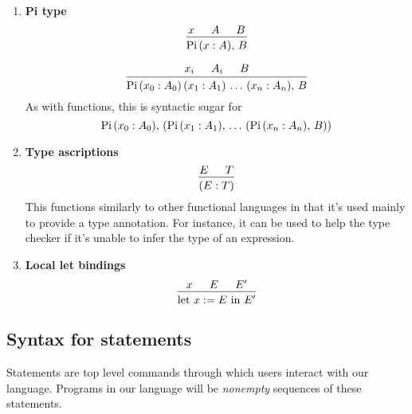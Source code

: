 \documentclass{article}
\begin{document}
\begin{enumerate}
\item \textbf{Pi type} \\
  \[
    \begin{prooftree}
      \hypo{x}
      \hypo{A}
      \hypo{B}
      \infer3{\Pii \, (x : A), \, B}
    \end{prooftree}
  \] 

  \[
    \begin{prooftree}
      \hypo{x_i}
      \hypo{A_i}
      \hypo{B}
      \infer3{\Pii \, (x_0 : A_0) \, (x_1 : A_1) \, \dots \, (x_n : A_n), \, B}
    \end{prooftree}
  \] 
  As with functions, this is syntactic sugar for
  \[ \operatorname{Pi} \, (x_0 : A_0), \, (\operatorname{Pi} \, (x_1 : A_1), \,  \dots \, (\operatorname{Pi} \, (x_n : A_n), \, B)) \]

\item \textbf{Type ascriptions} \\
  \[
    \begin{prooftree}
      \hypo{E}
      \hypo{T}
      \infer2{(E : T)}
    \end{prooftree}
  \]
  This functions similarly to other functional languages in that it's used
  mainly to provide a type annotation. For instance, it can be used to help the
  type checker if it's unable to infer the type of an expression.

\item \textbf{Local let bindings} \\
\[
  \begin{prooftree}
    \hypo{x}
    \hypo{E}
    \hypo{E'}
    \infer3{\text{let } x := E \text{ in } E'}
  \end{prooftree}
\]
\end{enumerate}

\subsection{Syntax for statements}
Statements are top level commands through which users interact with our
language. Programs in our language will be \textit{nonempty} sequences of
these statements.
\end{document}

